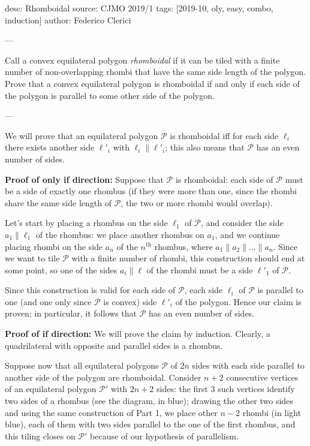 desc: Rhomboidal
source: CJMO 2019/1
tags: [2019-10, oly, easy, combo, induction]
author: Federico Clerici

---

Call a convex equilateral polygon \emph{rhomboidal} if it can be tiled with a finite number of non-overlapping rhombi that have the same side length of the polygon. Prove that a convex equilateral polygon is rhomboidal if and only if each side of the polygon is parallel to some other side of the polygon.

---

We will prove that an equilateral polygon $\mathcal{P}$ is rhomboidal iff for each side $\ell_i$ there exists another side $\ell'_i$ with $\ell_i \parallel \ell'_i$; this also means that $\mathcal{P}$ has an even number of sides.

\bigskip

\textbf{Proof of only if direction:}     Suppose that $\mathcal{P}$ is rhomboidal: each side of $\mathcal{P}$ must be a side of exactly one rhombus (if they were more than one, since the rhombi share the same side length of $\mathcal{P}$, the two or more rhombi would overlap).

Let's start by placing a rhombus on the side $\ell_1$ of $\mathcal{P}$, and consider the side $a_1\parallel \ell_1$ of the rhombus: we place another rhombus on $a_1$, and we continue placing rhombi on the side $a_{n}$ of the $n^{\text{th}}$ rhombus, where $a_1\parallel a_2\parallel ...\parallel a_n$. Since we want to tile $\mathcal{P}$ with a finite number of rhombi, this construction should end at some point, so one of the sides $a_i\parallel \ell$ of the rhombi must be a side $\ell'_1$ of $\mathcal{P}$.

Since this construction is valid for each side of $\mathcal{P}$, each side $\ell_i$ of $\mathcal{P}$ is parallel to one (and one only since $\mathcal{P}$ is convex) side $\ell'_i$ of the polygon. Hence our claim is proven; in particular, it follows that $\mathcal{P}$ has an even number of sides.

\bigskip

\textbf{Proof of if direction:}     We will prove the claim by induction. Clearly, a quadrilateral with opposite and parallel sides is a rhombus.

Suppose now that all equilateral polygons $\mathcal{P}$ of $2n$ sides with each side parallel to another side of the polygon are rhomboidal. Consider $n+2$ consecutive vertices of an equilateral polygon $\mathcal{P}'$ with $2n+2$ sides: the first $3$ such vertices identify two sides of a rhombus (see the diagram, in blue); drawing the other two sides and using the same construction of Part 1, we place other $n-2$ rhombi (in light blue), each of them with two sides parallel to the one of the first rhombus, and this tiling closes on $\mathcal{P}'$ because of our hypothesis of parallelism.

